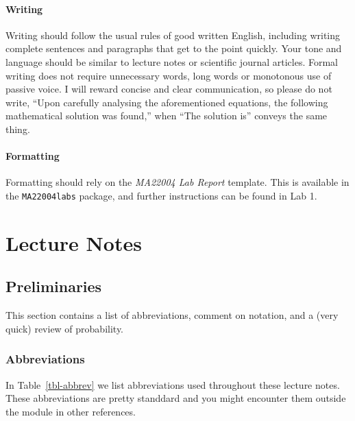 \documentclass[
  a4paper,
  oneside]{book}
\theoremstyle{definition}
\theoremstyle{definition}
\theoremstyle{definition}
\theoremstyle{plain}
\theoremstyle{remark}
\begin{document}
\subsection*{Writing}\label{w-eng}

Writing should follow the usual rules of good written English, including
writing complete sentences and paragraphs that get to the point quickly.
Your tone and language should be similar to lecture notes or scientific
journal articles. Formal writing does not require unnecessary words,
long words or monotonous use of passive voice. I will reward concise and
clear communication, so please do not write, ``Upon carefully analysing
the aforementioned equations, the following mathematical solution was
found,'' when ``The solution is'' conveys the same thing.

\subsection*{Formatting}\label{w-format}

Formatting should rely on the \emph{MA22004 Lab Report} template. This
is available in the \texttt{MA22004labs} package, and further
instructions can be found in Lab 1.

\part{Lecture Notes}

\chapter*{Preliminaries}\label{preliminaries}


This section contains a list of abbreviations, comment on notation, and
a (very quick) review of probability.

\section*{Abbreviations}\label{abbreviations}


In Table~\ref{tbl-abbrev} we list abbreviations used throughout these
lecture notes. These abbreviations are pretty standdard and you might
encounter them outside the module in other references.
\end{document}
